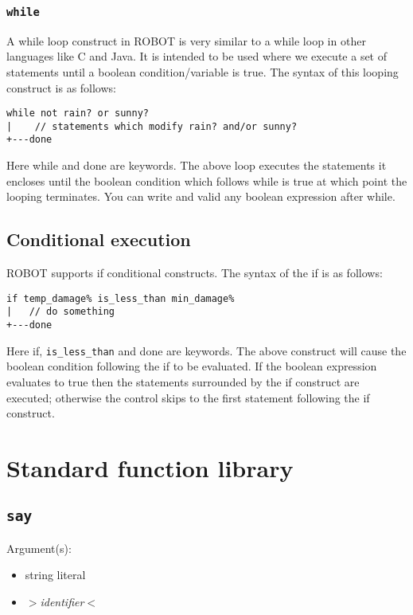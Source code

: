 \documentclass[a4paper]{article}
\begin{document}
\subsubsection{\texttt{while}}

A while loop construct in ROBOT is very similar to a while loop in other languages like C and Java. It is intended to be used where we execute a set of statements until a boolean condition/variable is true. The syntax of this looping construct is as follows:

\begin{verbatim}
while not rain? or sunny? 
|    // statements which modify rain? and/or sunny?
+---done
\end{verbatim}

Here while and done are keywords. The above loop executes the statements it encloses until the boolean condition which follows while is true at which point the looping terminates. You can write and valid any boolean expression after while.

\subsection{Conditional execution}

ROBOT supports if conditional constructs. The syntax of the if is as follows:

\begin{verbatim}
if temp_damage% is_less_than min_damage%
|   // do something
+---done
\end{verbatim}

Here if, \texttt{is\_less\_than} and done are keywords. The above construct will cause the boolean condition following the if to be evaluated. If the boolean expression evaluates to true then the statements surrounded by the if construct are executed; otherwise the control skips to the first statement following the if construct.

\pagebreak

\section{Standard function library}

\subsection{\texttt{say}}

Argument(s):
\begin{itemize}
	\item string literal
	\item $>$\textit{identifier}$<$
\end{itemize}
\end{document}
